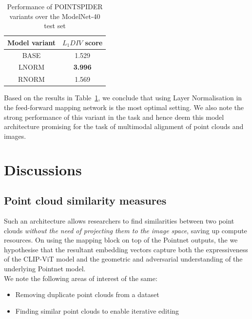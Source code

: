\documentclass[letterpaper, 10 pt, conference]{ieeeconf}  %
\begin{document}
\begin{table}[!h]
\vspace{-2mm}
\caption{Performance of POINTSPIDER variants over the ModelNet-40 test set}
\vspace{-4mm}
\label{alignment:metrics}
\begin{center}
\begin{tabular}{|c|c|}
\hline
\textbf{Model variant} & \textbf{$L_1DIV$ score} \\
\hline
BASE & 1.529 \\
\hline
LNORM & \textbf{3.996} \\
\hline
RNORM & 1.569 \\
\hline
\end{tabular}
\end{center}
\vspace{-6mm}
\end{table} 
\vspace{5pt}
Based on the results in Table~\ref{alignment:metrics}, we conclude that using Layer Normalisation in the feed-forward mapping network is the most optimal setting. We also note the strong performance of this variant in the task and hence deem this model architecture promising for the task of multimodal alignment of point clouds and images.


\section{Discussions}
\label{discussions}

\subsection{Point cloud similarity measures}
\label{discussions:differencing}
Such an architecture allows researchers to find similarities between two point clouds \textit{without the need of projecting them to the image space}, saving up compute resources. On using the mapping block on top of the Pointnet outputs, the we hypothesise that the resultant embedding vectors capture both the expressiveness of the CLIP-ViT model and the geometric and adversarial understanding of the underlying Pointnet model. \\
We note the following areas of interest of the same:
\begin{itemize}
    \item Removing duplicate point clouds from a dataset
    \item Finding similar point clouds to enable iterative editing
\end{itemize}
\end{document}

